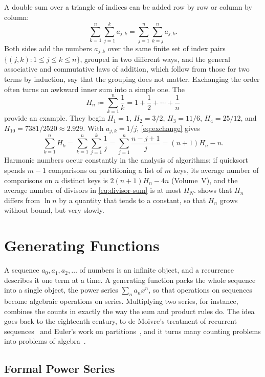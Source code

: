 A double sum over a triangle of indices can be added row by row or column by column:
\begin{equation}
\sum_{k=1}^{n}\sum_{j=1}^{k}a_{j,k}=\sum_{j=1}^{n}\sum_{k=j}^{n}a_{j,k} .
\label{eq:exchange}
\end{equation}
Both sides add the numbers $a_{j,k}$ over the same finite set of index pairs $\{(j,k): 1\le j\le k\le n\}$, grouped in two different ways, and the general associative and commutative laws of addition, which follow from those for two terms by induction, say that the grouping does not matter. Exchanging the order often turns an awkward inner sum into a simple one. The 
\[
H_n\coloneqq\sum_{k=1}^{n}\frac1k=1+\frac12+\cdots+\frac1n
\]
provide an example. They begin $H_1=1$, $H_2=3/2$, $H_3=11/6$, $H_4=25/12$, and $H_{10}=7381/2520\approx2.929$. With $a_{j,k}=1/j$, \eqref{eq:exchange} gives
\[
\sum_{k=1}^{n}H_k=\sum_{k=1}^{n}\sum_{j=1}^{k}\frac1j=\sum_{j=1}^{n}\frac{n-j+1}{j}=(n+1)H_n-n .
\]
Harmonic numbers occur constantly in the analysis of algorithms: if quicksort spends $m-1$ comparisons on partitioning a list of $m$ keys, its average number of comparisons on $n$ distinct keys is $2(n+1)H_n-4n$ (Volume~V), and the average number of divisors in \eqref{eq:divisor-sum} is at most $H_N$.  shows that $H_n$ differs from $\ln n$ by a quantity that tends to a constant, so that $H_n$ grows without bound, but very slowly.

\section{Generating Functions}
\label{sec:gf}

A sequence $a_0,a_1,a_2,\ldots$ of numbers is an infinite object, and a recurrence describes it one term at a time. A generating function packs the whole sequence into a single object, the power series $\sum_na_nx^n$, so that operations on sequences become algebraic operations on series. Multiplying two series, for instance, combines the counts in exactly the way the sum and product rules do. The idea goes back to the eighteenth century, to de Moivre's treatment of recurrent sequences~\cite[Sect.~1.2.8]{knuth1997taocp1} and Euler's work on partitions~\cite{andrews1976partitions}, and it turns many counting problems into problems of algebra~\cite{wilf2006,flajolet2009}.

\subsection{Formal Power Series}

